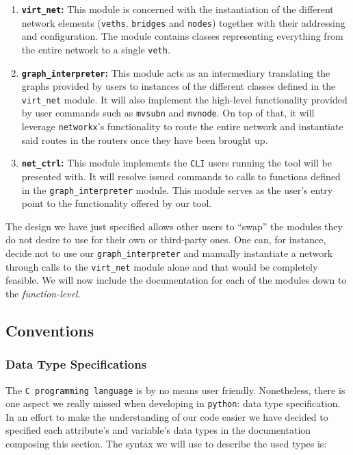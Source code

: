         \begin{enumerate}
            \item \textbf{\texttt{virt\_net}:} This module is concerned with the instantiation of the different network elements (\texttt{veths}, \texttt{bridges} and \texttt{nodes}) together with their addressing and configuration. The module contains classes representing everything from the entire network to a single \texttt{veth}.
            \item \textbf{\texttt{graph\_interpreter}:} This module acts as an intermediary translating the graphs provided by users to instances of the different classes defined in the \texttt{virt\_net} module. It will also implement the high-level functionality provided by user commands such as \texttt{mvsubn} and \texttt{mvnode}. On top of that, it will leverage \texttt{networkx}'s functionality to route the entire network and instantiate said routes in the routers once they have been brought up.
            \item \textbf{\texttt{net\_ctrl}:} This module implements the \texttt{CLI} users running the tool will be presented with. It will resolve issued commands to calls to functions defined in the \texttt{graph\_interpreter} module. This module serves as the user's entry point to the functionality offered by our tool.
        \end{enumerate}

        The design we have just specified allows other users to ``swap'' the modules they do not desire to use for their own or third-party ones. One can, for instance, decide not to use our \texttt{graph\_interpreter} and manually instantiate a network through calls to the \texttt{virt\_net} module alone and that would be completely feasible. We will now include the documentation for each of the modules down to the \textit{function-level}.\\

        \subsection{Conventions}
            \subsubsection{Data Type Specifications}
                The \texttt{C programming language} is by no means user friendly. Nonetheless, there is one aspect we really missed when developing in \texttt{python}: data type specification. In an effort to make the understanding of our code easier we have decided to specified each attribute's and variable's data types in the documentation composing this section. The syntax we will use to describe the used types is:\\

